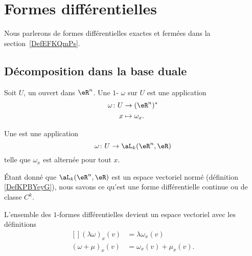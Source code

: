 
\section{Formes différentielles}
\label{SecFormDiffRappel}

Nous parlerons de formes différentielles exactes et fermées dans la section~\ref{DefEFKQmPs}.

\subsection{Décomposition dans la base duale}

\begin{definition}      \label{DEFooMGXSooWioKie}
	Soit \( U\), un ouvert dans \( \eR^n\). Une \( 1\)- \( \omega\) sur \( U\) est une application
	\begin{equation}
		\begin{aligned}
			\omega\colon U & \to (\eR^n)^*     \\
			x              & \mapsto \omega_x.
		\end{aligned}
	\end{equation}

	Une  est une application
	\begin{equation}
		\omega \colon U\to \aL_k(\eR^n,\eR)
	\end{equation}
	telle que \( \omega_x\) est alternée pour tout \( x\).

	Étant donné que \( \aL_k(\eR^n,\eR)\) est un espace vectoriel normé (définition \ref{DefKPBYeyG}), nous savons ce qu'est une forme différentielle continue ou de classe \( C^k\).
\end{definition}

\begin{remark}      \label{REMooSKKSooDZFMAr}
	L'ensemble des \( 1\)-formes différentielles devient un espace vectoriel avec les définitions
	\begin{equation}
		\begin{aligned}[]
			(\lambda\omega)_x(v) & =\lambda\omega_x(v)    \\
			(\omega+\mu)_x(v)    & =\omega_x(v)+\mu_x(v).
		\end{aligned}
	\end{equation}
\end{remark}

